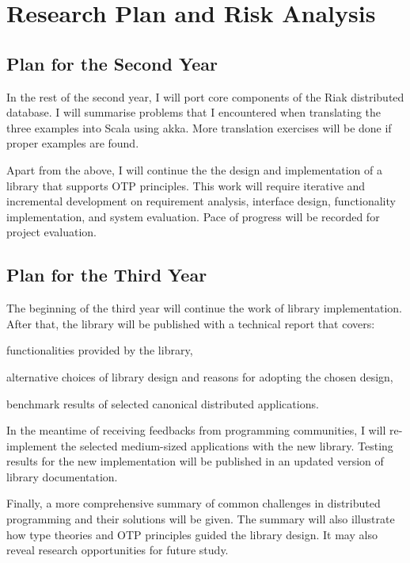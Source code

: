 \section{Research Plan and Risk Analysis}

\subsection{Plan for the Second Year}
In the rest of the second year, I will port core components of the Riak distributed database\cite{riak}.  I will summarise problems that I encountered when translating the three examples into Scala using akka.  More translation exercises will be done if proper examples are found.

Apart from the above, I will continue the the design and implementation of a library that supports OTP principles.  This work will require iterative and incremental development on requirement analysis, interface design, functionality implementation, and system evaluation.  Pace of progress will be recorded for project evaluation.

\subsection{Plan for the Third Year}
The beginning of the third year will continue the work of library implementation. After that, the library will be published with a technical report that covers:  
\begin{inparaenum}[(i)]
  \item functionalities provided by the library,
  \item alternative choices of library design and reasons for adopting the chosen design,
  \item benchmark results of selected canonical distributed applications.
\end{inparaenum}  

In the meantime of receiving feedbacks from programming communities, I will re-implement the selected medium-sized applications with the new library.  Testing results for the new implementation will be published in an updated version of library documentation.

Finally, a more comprehensive summary of common challenges in distributed programming and their solutions will be given.  The summary will also illustrate how type theories and OTP principles guided the library design.   It may also reveal research opportunities for future study.

